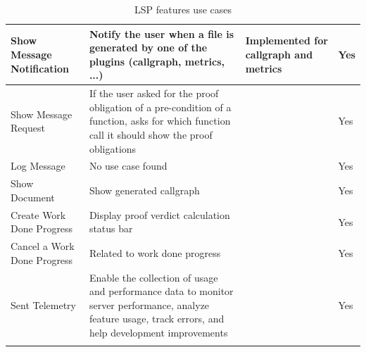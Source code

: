 \documentclass[10pt]{article}
\begin{document}
\begin{singlespace}
\begin{longtable}[H]{|p{3cm}|p{6cm}|p{3cm}|p{2cm}|}
	Show Message Notification &
	  Notify the user when a file is generated by one of the plugins (callgraph, metrics, ...)
	  & Implemented for callgraph and metrics & 
	  Yes \\ \hline
	Show Message Request &
	  If the user asked for the proof obligation of a pre-condition of a function, asks for which function call it should show the proof obligations
	  & & 
	  Yes \\ \hline
	Log Message &
	  No use case found
	  & & 
	  Yes \\ \hline
	Show Document &
	  Show generated callgraph
	  & & 
	  Yes \\ \hline
	Create Work Done Progress &
	  Display proof verdict calculation status bar
	  & & 
	  Yes \\ \hline
	Cancel a Work Done Progress &
	  Related to work done progress
	  & & 
	  Yes \\ \hline
	Sent Telemetry &
	  Enable the collection of usage and performance data to monitor server performance, analyze feature usage, track errors, and help development improvements
	  & & 
	  Yes \\ \hline
	\caption{LSP features use cases}
	\label{tab:lsp-features}
\end{longtable}


\end{singlespace}
\end{document}
